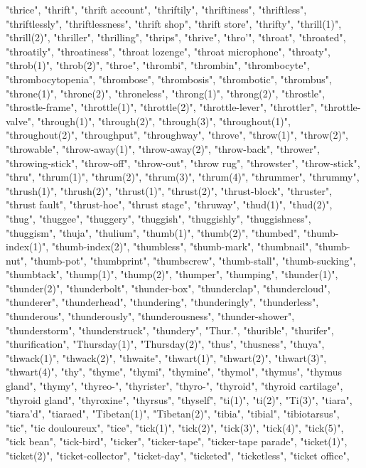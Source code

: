"thrice",
"thrift",
"thrift account",
"thriftily",
"thriftiness",
"thriftless",
"thriftlessly",
"thriftlessness",
"thrift shop",
"thrift store",
"thrifty",
"thrill(1)",
"thrill(2)",
"thriller",
"thrilling",
"thrips",
"thrive",
"thro'",
"throat",
"throated",
"throatily",
"throatiness",
"throat lozenge",
"throat microphone",
"throaty",
"throb(1)",
"throb(2)",
"throe",
"thrombi",
"thrombin",
"thrombocyte",
"thrombocytopenia",
"thrombose",
"thrombosis",
"thrombotic",
"thrombus",
"throne(1)",
"throne(2)",
"throneless",
"throng(1)",
"throng(2)",
"throstle",
"throstle-frame",
"throttle(1)",
"throttle(2)",
"throttle-lever",
"throttler",
"throttle-valve",
"through(1)",
"through(2)",
"through(3)",
"throughout(1)",
"throughout(2)",
"throughput",
"throughway",
"throve",
"throw(1)",
"throw(2)",
"throwable",
"throw-away(1)",
"throw-away(2)",
"throw-back",
"thrower",
"throwing-stick",
"throw-off",
"throw-out",
"throw rug",
"throwster",
"throw-stick",
"thru",
"thrum(1)",
"thrum(2)",
"thrum(3)",
"thrum(4)",
"thrummer",
"thrummy",
"thrush(1)",
"thrush(2)",
"thrust(1)",
"thrust(2)",
"thrust-block",
"thruster",
"thrust fault",
"thrust-hoe",
"thrust stage",
"thruway",
"thud(1)",
"thud(2)",
"thug",
"thuggee",
"thuggery",
"thuggish",
"thuggishly",
"thuggishness",
"thuggism",
"thuja",
"thulium",
"thumb(1)",
"thumb(2)",
"thumbed",
"thumb-index(1)",
"thumb-index(2)",
"thumbless",
"thumb-mark",
"thumbnail",
"thumb-nut",
"thumb-pot",
"thumbprint",
"thumbscrew",
"thumb-stall",
"thumb-sucking",
"thumbtack",
"thump(1)",
"thump(2)",
"thumper",
"thumping",
"thunder(1)",
"thunder(2)",
"thunderbolt",
"thunder-box",
"thunderclap",
"thundercloud",
"thunderer",
"thunderhead",
"thundering",
"thunderingly",
"thunderless",
"thunderous",
"thunderously",
"thunderousness",
"thunder-shower",
"thunderstorm",
"thunderstruck",
"thundery",
"Thur.",
"thurible",
"thurifer",
"thurification",
"Thursday(1)",
"Thursday(2)",
"thus",
"thusness",
"thuya",
"thwack(1)",
"thwack(2)",
"thwaite",
"thwart(1)",
"thwart(2)",
"thwart(3)",
"thwart(4)",
"thy",
"thyme",
"thymi",
"thymine",
"thymol",
"thymus",
"thymus gland",
"thymy",
"thyreo-",
"thyrister",
"thyro-",
"thyroid",
"thyroid cartilage",
"thyroid gland",
"thyroxine",
"thyrsus",
"thyself",
"ti(1)",
"ti(2)",
"Ti(3)",
"tiara",
"tiara'd",
"tiaraed",
"Tibetan(1)",
"Tibetan(2)",
"tibia",
"tibial",
"tibiotarsus",
"tic",
"tic douloureux",
"tice",
"tick(1)",
"tick(2)",
"tick(3)",
"tick(4)",
"tick(5)",
"tick bean",
"tick-bird",
"ticker",
"ticker-tape",
"ticker-tape parade",
"ticket(1)",
"ticket(2)",
"ticket-collector",
"ticket-day",
"ticketed",
"ticketless",
"ticket office",

